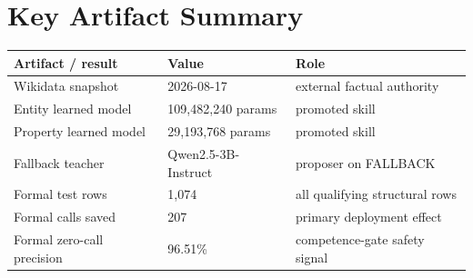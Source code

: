 \documentclass[10pt]{article}
\begin{document}
\section{Key Artifact Summary}
\begin{table}[h]
\centering
\small
\begin{tabular}{lll}
\toprule
Artifact / result & Value & Role \\
\midrule
Wikidata snapshot & 2026-08-17 & external factual authority \\
Entity learned model & 109,482,240 params & promoted skill \\
Property learned model & 29,193,768 params & promoted skill \\
Fallback teacher & Qwen2.5-3B-Instruct & proposer on FALLBACK \\
Formal test rows & 1,074 & all qualifying structural rows \\
Formal calls saved & 207 & primary deployment effect \\
Formal zero-call precision & 96.51\% & competence-gate safety signal \\
\bottomrule
\end{tabular}
\end{table}
\end{document}
